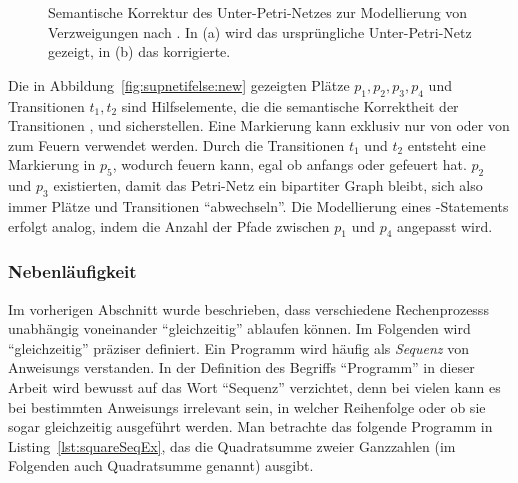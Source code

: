 \begin{figure}
	\caption[Semantische Korrektur des Unter-Petri-Netzes zur Modellierung von Verzweigungen.]{Semantische Korrektur des Unter-Petri-Netzes zur Modellierung von Verzweigungen nach \cite[Abbildung~3.1]{Goel1990}. In (a) wird das ursprüngliche Unter-Petri-Netz gezeigt, in (b) das korrigierte.}\label{fig:supnetifelse}
\end{figure}

Die in Abbildung~\ref{fig:supnetifelse:new} gezeigten Plätze $p_1,p_2,p_3,p_4$ und Transitionen $t_1,t_2$ sind Hilfselemente, die die semantische Korrektheit der Transitionen ,  und  sicherstellen. Eine Markierung kann exklusiv nur von  oder von  zum Feuern verwendet werden. Durch die Transitionen $t_1$ und $t_2$ entsteht eine Markierung in $p_5$, wodurch  feuern kann, egal ob anfangs  oder  gefeuert hat. $p_2$ und $p_3$ existierten, damit das Petri-Netz ein bipartiter Graph bleibt, sich also immer Plätze und Transitionen \enquote{abwechseln}. Die Modellierung eines -Statements erfolgt analog, indem die Anzahl der Pfade zwischen $p_1$ und $p_4$ angepasst wird.

\subsubsection{Nebenläufigkeit}\label{sec:nebenl}
Im vorherigen Abschnitt wurde beschrieben, dass verschiedene \glspl{Rechenprozess} unabhängig voneinander \enquote{gleichzeitig} ablaufen können. Im Folgenden wird \enquote{gleichzeitig} präziser definiert. Ein \gls{Programm} wird häufig als \emph{Sequenz} von \glspl{Anweisung} verstanden. In der Definition des Begriffs \enquote{\gls{Programm}} in dieser Arbeit wird bewusst auf das Wort \enquote{Sequenz} verzichtet, denn bei vielen  kann es bei bestimmten \glspl{Anweisung} irrelevant sein, in welcher Reihenfolge oder ob sie sogar gleichzeitig ausgeführt werden. Man betrachte das folgende \gls{Programm} in Listing~\ref{lst:squareSeqEx}, das die Quadratsumme zweier Ganzzahlen (im Folgenden auch Quadratsumme genannt) ausgibt.

